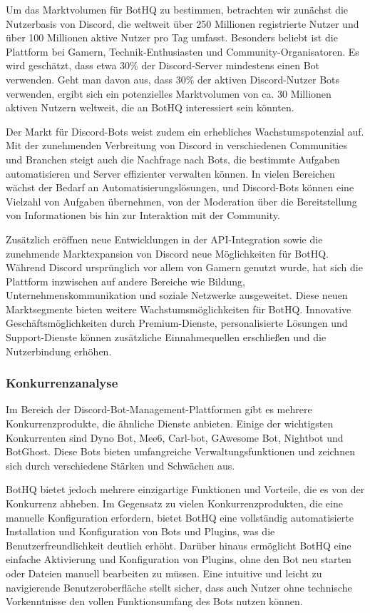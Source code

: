 Um das Marktvolumen für BotHQ zu bestimmen, betrachten wir zunächst die Nutzerbasis von Discord, die weltweit über 250 Millionen registrierte Nutzer und über 100 Millionen aktive Nutzer pro Tag umfasst. Besonders beliebt ist die Plattform bei Gamern, Technik-Enthusiasten und Community-Organisatoren. Es wird geschätzt, dass etwa 30\% der Discord-Server mindestens einen Bot verwenden. Geht man davon aus, dass 30\% der aktiven Discord-Nutzer Bots verwenden, ergibt sich ein potenzielles Marktvolumen von ca. 30 Millionen aktiven Nutzern weltweit, die an BotHQ interessiert sein könnten.

Der Markt für Discord-Bots weist zudem ein erhebliches Wachstumspotenzial auf. Mit der zunehmenden Verbreitung von Discord in verschiedenen Communities und Branchen steigt auch die Nachfrage nach Bots, die bestimmte Aufgaben automatisieren und Server effizienter verwalten können. In vielen Bereichen wächst der Bedarf an Automatisierungslösungen, und Discord-Bots können eine Vielzahl von Aufgaben übernehmen, von der Moderation über die Bereitstellung von Informationen bis hin zur Interaktion mit der Community.

Zusätzlich eröffnen neue Entwicklungen in der API-Integration sowie die zunehmende Marktexpansion von Discord neue Möglichkeiten für BotHQ. Während Discord ursprünglich vor allem von Gamern genutzt wurde, hat sich die Plattform inzwischen auf andere Bereiche wie Bildung, Unternehmenskommunikation und soziale Netzwerke ausgeweitet. Diese neuen Marktsegmente bieten weitere Wachstumsmöglichkeiten für BotHQ. Innovative Geschäftsmöglichkeiten durch Premium-Dienste, personalisierte Lösungen und Support-Dienste können zusätzliche Einnahmequellen erschließen und die Nutzerbindung erhöhen.

\subsubsection{Konkurrenzanalyse}\label{konkurrenzanalyse}

Im Bereich der Discord-Bot-Management-Plattformen gibt es mehrere Konkurrenzprodukte, die ähnliche Dienste anbieten. Einige der wichtigsten Konkurrenten sind Dyno Bot, Mee6, Carl-bot, GAwesome Bot, Nightbot und BotGhost. Diese Bots bieten umfangreiche Verwaltungsfunktionen und zeichnen sich durch verschiedene Stärken und Schwächen aus.

BotHQ bietet jedoch mehrere einzigartige Funktionen und Vorteile, die es von der Konkurrenz abheben. Im Gegensatz zu vielen Konkurrenzprodukten, die eine manuelle Konfiguration erfordern, bietet BotHQ eine vollständig automatisierte Installation und Konfiguration von Bots und Plugins, was die Benutzerfreundlichkeit deutlich erhöht. Darüber hinaus ermöglicht BotHQ eine einfache Aktivierung und Konfiguration von Plugins, ohne den Bot neu starten oder Dateien manuell bearbeiten zu müssen. Eine intuitive und leicht zu navigierende Benutzeroberfläche stellt sicher, dass auch Nutzer ohne technische Vorkenntnisse den vollen Funktionsumfang des Bots nutzen können.

